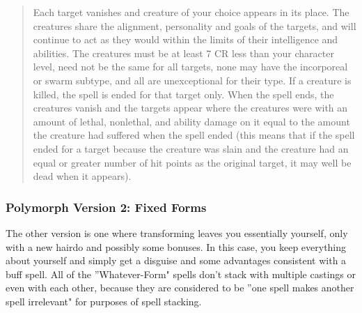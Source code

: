 \begin{quote}
\begin{small}
\end{small}

Each target vanishes and creature of your choice appears in its place. The creatures share the alignment, personality and goals of the targets, and will continue to act as they would within the limits of their intelligence and abilities. The creatures must be at least 7 CR less than your character level, need not be the same for all targets, none may have the incorporeal or swarm subtype, and all are unexceptional for their type. If a creature is killed, the spell is ended for that target only. When the spell ends, the creatures vanish and the targets appear where the creatures were with an amount of lethal, nonlethal, and ability damage on it equal to the amount the creature had suffered when the spell ended (this means that if the spell ended for a target because the creature was slain and the creature had an equal or greater number of hit points as the original target, it may well be dead when it appears).

\end{quote}

\subsubsection{Polymorph Version 2: Fixed Forms}

The other version is one where transforming leaves you essentially yourself, only with a new hairdo and possibly some bonuses. In this case, you keep everything about yourself and simply get a disguise and some advantages consistent with a buff spell. All of the ''Whatever-Form" spells don't stack with multiple castings or even with each other, because they are considered to be ''one spell makes another spell irrelevant" for purposes of spell stacking.


